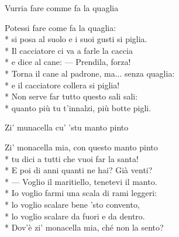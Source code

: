 \documentclass[11pt]{book}
\begin{document}
\begin{poem}{Vurria fare comme fa la quaglia}{}
\settowidth{\versewidth}{Torna il cane al padrone, ma... senza quaglia}
\begin{altverse}
Potessi fare come fa la quaglia:\\*
si posa al suolo e i suoi gusti si piglia.\\*
Il cacciatore ci va a farle la caccia\\*
e dice al cane: — Prendila, forza!\\*
Torna il cane al padrone, ma... senza quaglia:\\*
e il cacciatore collera si piglia!\\*
Non serve far tutto questo sali sali:\\*
quanto più tu t’innalzi, più botte pigli.
\end{altverse}
\end{poem}

\begin{poem}{Zi’ munacella cu’ ’stu manto pinto}{}
\settowidth{\versewidth}{Zi’ monacella mia, con questo manto pinto}
\begin{altverse}
Zi’ monacella mia, con questo manto pinto\\*
tu dici a tutti che vuoi far la santa!\\*
E poi di anni quanti ne hai? Già venti?\\*
— Voglio il maritiello, tenetevi il manto.\\*
Io voglio farmi una scala di rami leggeri:\\*
lo voglio scalare bene ’sto convento,\\*
lo voglio scalare da fuori e da dentro.\\*
Dov’è zi’ monacella mia, ché non la sento?
\end{altverse}
\end{poem}
\end{document}
